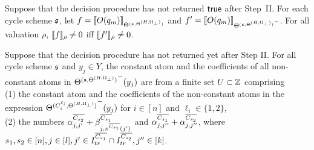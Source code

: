 \begin{lemma}\label{prop-bnd-domain-1}
	Suppose that the decision procedure has not returned $\mathsf{true}$ after Step~II. For each cycle scheme ${\mathfrak{s} }$, let $f=\llbracket O(q_m)\rrbracket_{\Theta^{({\mathfrak{s} }, \Theta^{(H,\Omega_\bot)})}}$ and $f'=\llbracket O(q_m)\rrbracket_{{\Theta^{({\mathfrak{s} }, \Theta^{(H,\Omega_\bot)})}}^-}$. For all valuation $\rho$, $\llbracket f\rrbracket_{\rho}\neq 0$ iff $\llbracket f'\rrbracket_{\rho} \neq 0$.
\end{lemma}





\begin{lemma}\label{prop-bnd-domain-2}
Suppose that the decision procedure has not returned yet after Step II. 
For all cycle scheme ${\mathfrak{s} }$ and $y_j \in Y$, the constant atom and the coefficients of all non-constant atoms in ${\Theta^{({\mathfrak{s} }, \Theta^{(H,\Omega_\bot)})}}^-(y_j)$ are from a finite set $U \subset {\mathbb{Z} }$ comprising \\ (1)
the constant atom and the coefficients of the non-constant atoms in the expression ${\Theta^{(C^{\ell_i}_{i}, \Theta^{(H,\Omega_\bot)})}}^-(y_j)$ for $i\in [n]$ and $\ell_i \in \{1,2\}$,\smallskip\\(2) the numbers $\alpha^{\overline{C_{s_2}}}_{j,j'} + \beta^{\overline{C_{s_1}}}_{j,\pi^{\overline{C_{s_1}}}(j')}$ and $\alpha^{\overline{C_{s_1}}}_{j, j''} + \alpha^{\overline{C_{s_2}}}_{j,j''}$, where  $s_1,s_2 \in [n], j\in[l],j' \in I^{\overline{C_{s_1}}}_{tr} \cap I^{\overline{C_{s_2}}}_{tr},  j'' \in [k]$. 

\end{lemma}

